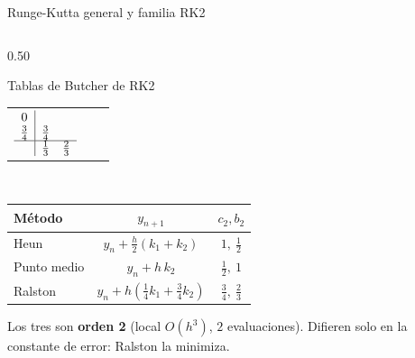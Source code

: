 \documentclass[aspectratio=169,10pt]{beamer}
\begin{document}
\begin{frame}{Runge-Kutta general y familia RK2}
\begin{columns}[T]
\begin{column}{0.50\textwidth}
\begin{cardgear}{Tablas de Butcher de RK2}{\faTable}
{\begin{tabular}{ccc}
$\begin{array}{c|cc} 0 & & \\ \tfrac34 & \tfrac34 & \\ \hline & \tfrac13 & \tfrac23 \end{array}$
\end{tabular}}\\[2mm]
{\footnotesize\renewcommand{\arraystretch}{1.25}\setlength{\tabcolsep}{4pt}
\begin{tabular}{l|c|c}
Método & $y_{n+1}$ & $c_2,b_2$\\\hline
Heun & $y_n+\tfrac{h}{2}(k_1+k_2)$ & $1,\ \tfrac12$\\
Punto medio & $y_n+h\,k_2$ & $\tfrac12,\ 1$\\
Ralston & $y_n+h(\tfrac14k_1+\tfrac34k_2)$ & $\tfrac34,\ \tfrac23$\\
\end{tabular}}
\end{cardgear}
\vspace{1mm}
\begin{cardnota}[\faInfoCircle]
{\footnotesize Los tres son \textbf{orden 2} (local $O(h^3)$, $2$ evaluaciones). Difieren solo en la constante de error: Ralston la minimiza.}
\end{cardnota}
\end{column}
\end{columns}
\end{frame}
\end{document}
